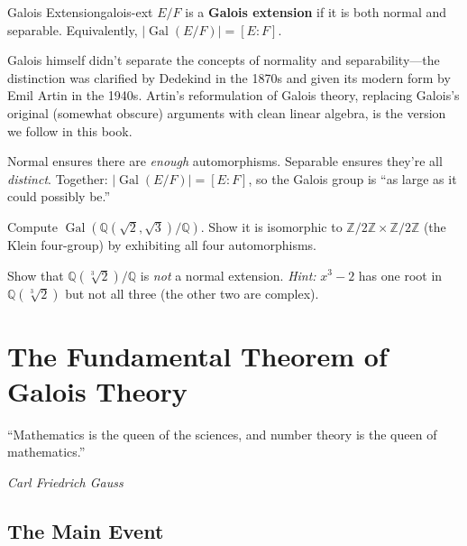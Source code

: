 \documentclass[11pt, a4paper, oneside]{book}
\newcommand{\Z}{\mathbb{Z}}
\newcommand{\Q}{\mathbb{Q}}
\newcommand{\Gal}{\operatorname{Gal}}
\newcounter{exercise}[chapter]
\begin{document}
\begin{defn}{Galois Extension}{galois-ext}
$E/F$ is a \textbf{Galois extension} if it is both normal and separable.
Equivalently, $|\Gal(E/F)| = [E:F]$.
\end{defn}

\begin{historical}[title={Dedekind and Artin}]
Galois himself didn't separate the concepts of normality and separability---the
distinction was clarified by Dedekind in the 1870s and given its modern form by
Emil Artin in the 1940s. Artin's reformulation of Galois theory, replacing
Galois's original (somewhat obscure) arguments with clean linear algebra, is
the version we follow in this book.
\end{historical}

\begin{intuition}
Normal ensures there are \emph{enough} automorphisms. Separable ensures
they're all \emph{distinct}. Together: $|\Gal(E/F)| = [E:F]$, so the Galois
group is ``as large as it could possibly be.''
\end{intuition}

\begin{exercisebox}[title={Exercise 7.1}]
Compute $\Gal(\Q(\sqrt{2}, \sqrt{3})/\Q)$. Show it is isomorphic to
$\Z/2\Z \times \Z/2\Z$ (the Klein four-group) by exhibiting all four
automorphisms.
\end{exercisebox}

\begin{exercisebox}[title={Exercise 7.2}]
Show that $\Q(\sqrt[3]{2})/\Q$ is \emph{not} a normal extension.
\emph{Hint:} $x^3 - 2$ has one root in $\Q(\sqrt[3]{2})$ but not all three
(the other two are complex).
\end{exercisebox}

\chapter{The Fundamental Theorem of Galois Theory}

\epigraph{``Mathematics is the queen of the sciences, and number theory is
the queen of mathematics.''}{\textit{Carl Friedrich Gauss}}

\section{The Main Event}
\end{document}
